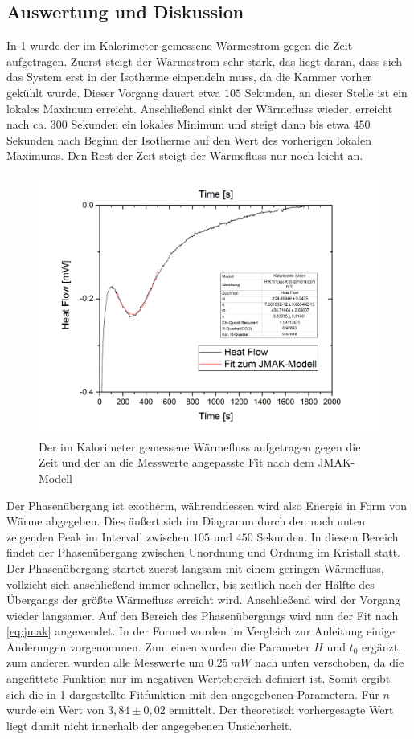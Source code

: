 \documentclass[
	a4paper,
	12pt,
	pagesize,
	ngerman
]{scrartcl}
\begin{document}
\subsection{Auswertung und Diskussion}
In \cref{3} wurde der im Kalorimeter gemessene Wärmestrom gegen die Zeit aufgetragen. Zuerst steigt der Wärmestrom sehr stark, das liegt daran, dass sich das System erst in der Isotherme einpendeln muss, da die Kammer vorher gekühlt wurde. Dieser Vorgang dauert etwa $105$ Sekunden, an dieser Stelle ist ein lokales Maximum erreicht. Anschließend sinkt der Wärmefluss wieder, erreicht nach ca. $300$ Sekunden ein lokales Minimum und steigt dann bis etwa $450$ Sekunden nach Beginn der Isotherme auf den Wert des vorherigen lokalen Maximums. Den Rest der Zeit steigt der Wärmefluss nur noch leicht an.

\begin{figure}[hb]
	\centering
	\includegraphics[scale=0.6]{Graph3.png}
	\caption{Der im Kalorimeter gemessene Wärmefluss aufgetragen gegen die Zeit und der an die Messwerte angepasste Fit nach dem JMAK-Modell}
	\label{3}
\end{figure}

Der Phasenübergang ist exotherm, währenddessen wird also Energie in Form von Wärme abgegeben. Dies äußert sich im Diagramm durch den nach unten zeigenden Peak im Intervall zwischen $105$ und $450$ Sekunden. In diesem Bereich findet der Phasenübergang zwischen Unordnung und Ordnung im Kristall statt. Der Phasenübergang startet zuerst langsam mit einem geringen Wärmefluss, vollzieht sich anschließend immer schneller, bis zeitlich nach der Hälfte des Übergangs der größte Wärmefluss erreicht wird. Anschließend wird der Vorgang wieder langsamer. Auf den Bereich des Phasenübergangs wird nun der Fit nach \cref{eq:jmak} angewendet. In der Formel wurden im Vergleich zur Anleitung einige Änderungen vorgenommen. Zum einen wurden die Parameter $H$ und $t_0$ ergänzt, zum anderen wurden alle Messwerte um $\SI{0,25}{mW}$ nach unten verschoben, da die angefittete Funktion nur im negativen Wertebereich definiert ist. Somit ergibt sich die in \cref{3} dargestellte Fitfunktion mit den angegebenen Parametern. Für $n$ wurde ein Wert von $3,84\pm0,02$ ermittelt. Der theoretisch vorhergesagte Wert liegt damit nicht innerhalb der angegebenen Unsicherheit.
\end{document}
